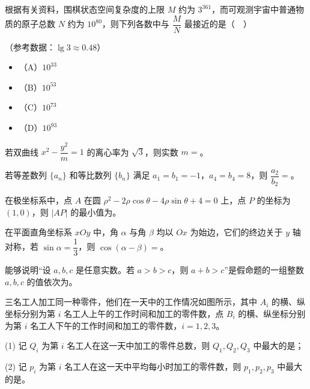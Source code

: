\begin{question}
根据有关资料，围棋状态空间复杂度的上限 $M$ 约为 $3^{361}$，而可观测宇宙中普通物质的原子总数 $N$ 约为 $10^{80}$，则下列各数中与 $\dfrac MN$ 最接近的是（　）

（参考数据：$\lg3\approx0.48$）

\begin{itemize}
\item （A）$10^{33}$
\item （B）$10^{53}$
\item （C）$10^{73}$
\item （D）$10^{93}$
\end{itemize}

\end{question}

\begin{question}
若双曲线 $x^2-\dfrac{y^2}{m}=1$ 的离心率为 $\sqrt3$，则实数 $m=$\gkblank{}。

\end{question}
\begin{question}
若等差数列 $\{a_n\}$ 和等比数列 $\{b_n\}$ 满足 $a_1=b_1=-1$，$a_4=b_4=8$，则 $\dfrac{a_2}{b_2}=$\gkblank{}。

\end{question}
\begin{question}
在极坐标系中，点 $A$ 在圆 $\rho^2-2\rho\cos\theta-4\rho\sin\theta+4=0$ 上，点 $P$ 的坐标为 $(1,0)$，则 $|AP|$ 的最小值为\gkblank{}。

\end{question}
\begin{question}
在平面直角坐标系 $xOy$ 中，角 $\alpha$ 与角 $\beta$ 均以 $Ox$ 为始边，它们的终边关于 $y$ 轴对称，若 $\sin\alpha=\dfrac13$，则 $\cos(\alpha-\beta)=$\gkblank{}。

\end{question}
\begin{question}
能够说明“设 $a,b,c$ 是任意实数。若 $a>b>c$，则 $a+b>c$”是假命题的一组整数 $a,b,c$ 的值依次为\gkblank{}。

\Needspace{0.4\textheight}
\end{question}
\begin{question}
三名工人加工同一种零件，他们在一天中的工作情况如图所示，其中 $A_i$ 的横、纵坐标分别为第 $i$ 名工人上午的工作时间和加工的零件数，点 $B_i$ 的横、纵坐标分别为第 $i$ 名工人下午的工作时间和加工的零件数，$i=1,2,3$。
\nopagebreak[4]
\begin{center}\end{center}
\nopagebreak[4]
(1) 记 $Q_i$ 为第 $i$ 名工人在这一天中加工的零件总数，则 $Q_1,Q_2,Q_3$ 中最大的是\gkblank{}；

(2) 记 $p_i$ 为第 $i$ 名工人在这一天中平均每小时加工的零件数，则 $p_1,p_2,p_3$ 中最大的是\gkblank{}。

\end{question}

